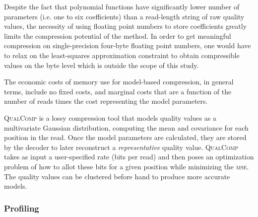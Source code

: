 \documentclass{bioinfo}
\begin{document}
\begin{methods}
Despite the fact that polynomial functions have significantly lower
number of parameters (i.e. one to six coefficients) than a read-length
string of raw quality values, the necessity of using floating point
numbers to store coefficients greatly limits the compression potential
of the method. In order to get meaningful compression on
single-precision four-byte floating point numbers, one would have to
relax on the least-squares approximation constraint to obtain
compressible values on the byte level which is outside the scope of
this study.

The economic costs of memory use for model-based compression, in
general terms, include no fixed costs, and marginal costs that are a
function of the number of reads times the cost representing the model
parameters.

\textsc{QualComp} is a lossy compression tool that models quality values as a multivariate Gaussian distribution, computing the mean and covariance for each position in the read\citep{Ochoa:2013rt}.
Once the model parameters are calculated, they are stored by the decoder to later reconstruct a \emph{representative} quality value.
\textsc{QualComp} takes as input a user-specified rate (bits per read) and then poses an optimization problem of how to allot these bits for a given position while minimizing the \textsc{mse}.
The quality values can be clustered before hand to produce more accurate models.



\subsubsection{Profiling}


\end{methods}
\end{document}
